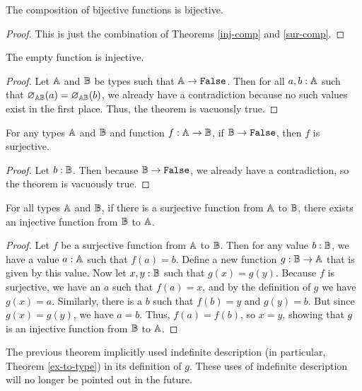 \documentclass[../math.tex]{subfiles}
\begin{document}
\begin{instance} \label{bij-comp}
    The composition of bijective functions is bijective.
\end{instance}
\begin{proof}
    This is just the combination of Theorems \ref{inj-comp} and \ref{sur-comp}.
\end{proof}

\begin{instance} \label{empty-inj}
    The empty function is injective.
\end{instance}
\begin{proof}
    Let $\mathbb{A}$ and $\mathbb{B}$ be types such that $\A \rightarrow \vtt{False}$.  Then for
    all $a, b : \mathbb{A}$ such that $\varnothing_{\mathbb{A}\mathbb{B}}(a) = \varnothing_{\mathbb{A}\mathbb{B}}(b)$,
    we already have a contradiction because no such values exist in the first
    place.  Thus, the theorem is vacuously true.
\end{proof}

\begin{instance}
    For any types $\mathbb{A}$ and $\mathbb{B}$ and function $f : \mathbb{A} \rightarrow \mathbb{B}$, if $\B
    \rightarrow \vtt{False}$, then $f$ is surjective.
\end{instance}
\begin{proof}
    Let $b : \mathbb{B}$.  Then because $\B \rightarrow \vtt{False}$, we already have a
    contradiction, so the theorem is vacuously true.
\end{proof}

\begin{theorem}
    For all types $\mathbb{A}$ and $\mathbb{B}$, if there is a surjective function from $\mathbb{A}$ to
    $\mathbb{B}$, there exists an injective function from $\mathbb{B}$ to $\mathbb{A}$.
\end{theorem}
\begin{proof}
    Let $f$ be a surjective function from $\mathbb{A}$ to $\mathbb{B}$.  Then for any value $b :
    \mathbb{B}$, we have a value $a : \mathbb{A}$ such that $f(a) = b$.  Define a new function
    $g : \mathbb{B} \rightarrow \mathbb{A}$ that is given by this value.  Now let $x, y : \mathbb{B}$
    such that $g(x) = g(y)$.  Because $f$ is surjective, we have an $a$ such
    that $f(a) = x$, and by the definition of $g$ we have $g(x) = a$.
    Similarly, there is a $b$ such that $f(b) = y$ and $g(y) = b$.  But since
    $g(x) = g(y)$, we have $a = b$.  Thus, $f(a) = f(b)$, so $x = y$, showing
    that $g$ is an injective function from $\mathbb{B}$ to $\mathbb{A}$.
\end{proof}

The previous theorem implicitly used indefinite description (in particular,
Theorem \ref{ex-to-type}) in its definition of $g$.  These uses of indefinite
description will no longer be pointed out in the future.
\end{document}
